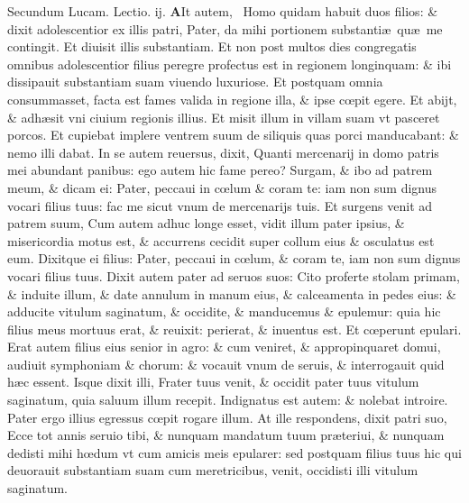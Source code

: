 \documentclass[a5paper,10pt]{book}
\def\leftmarginnote{%
	\lrmarginnote{\hskip -\marginparsep \hskip -6.5em}}
\def\ae{æ}
\def\oe{œ}
\begin{document}
\begin{multicols*}{2}
\newline \color{red} Secundum Lucam. \hfill Lectio. ij. \color{black}
\newline
\lettrine[lines=2]{\bfseries \color{red} A}{}It\leftmarginnote{\begin{flushright}c. 15.\\c\end{flushright}} autem, \textdagger \ Homo quidam habuit duos filios: \& dixit adolescentior ex illis patri, Pater, da mihi portionem substanti\ae \ qu\ae \ me contingit.
Et diuisit illis substantiam. Et non post multos dies congregatis omnibus adolescentior filius peregre profectus est in regionem longinquam: \& ibi dissipauit substantiam suam viuendo luxuriose.
Et postquam omnia consummasset, facta est fames valida in regione illa, \& ipse c\oe pit egere.
Et abijt, \& adh\ae sit vni ciuium regionis illius. Et misit illum in villam suam vt pasceret porcos.
Et cupiebat implere ventrem suum de siliquis quas porci manducabant: \& nemo illi dabat.
In se autem reuersus, dixit, Quanti mercenarij in domo patris mei abundant panibus: ego autem hic fame pereo?
Surgam, \& ibo ad patrem meum, \& dicam ei: Pater, peccaui in c\oe lum \& coram te: iam non sum dignus vocari filius tuus: fac me sicut vnum de mercenarijs tuis.
Et surgens venit ad patrem suum, Cum autem adhuc longe esset, vidit illum pater ipsius, \& misericordia motus est, \& accurrens cecidit super collum eius \& osculatus est eum.
Dixitque ei filius: Pater, peccaui in c\oe lum, \& coram te, iam non sum dignus vocari filius tuus.
Dixit autem pater ad seruos suos: Cito proferte stolam
primam, \& induite illum, \& date annulum in manum eius, \& calceamenta in pedes eius: \& adducite vitulum saginatum, \& occidite, \& manducemus \& epulemur: quia hic filius meus mortuus erat, \& reuixit: perierat, \& inuentus est.
Et c\oe perunt epulari. Erat autem filius eius senior in agro: \& cum veniret, \& appropinquaret domui, audiuit symphoniam \& chorum: \& vocauit vnum de seruis, \& interrogauit quid h\ae c essent.
Isque dixit illi, Frater tuus venit, \& occidit pater tuus vitulum saginatum, quia saluum illum recepit.
Indignatus est autem: \& nolebat introire. Pater ergo illius egressus c\oe pit rogare illum.
At ille respondens, dixit patri suo, Ecce tot annis seruio tibi, \& nunquam mandatum tuum pr\ae teriui, \& nunquam dedisti mihi h\oe dum vt cum amicis meis epularer: sed postquam filius tuus hic qui deuorauit substantiam suam cum meretricibus, venit, occidisti illi vitulum saginatum.

\end{multicols*}
\end{document}
